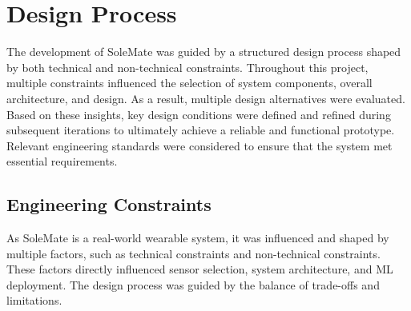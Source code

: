 
\chapter{Design Process}
\label{chapter:design_process}
The development of SoleMate was guided by a structured design process shaped by both technical and non-technical constraints. Throughout this project, multiple constraints influenced the selection of system components, overall architecture, and design. As a result, multiple design alternatives were evaluated. Based on these insights, key design conditions were defined and refined during subsequent iterations to ultimately achieve a reliable and functional prototype. Relevant engineering standards were considered to ensure that the system met essential requirements. 



\section{Engineering Constraints}
As SoleMate is a real-world wearable system, it was influenced and shaped by multiple factors, such as technical constraints and non-technical constraints. These factors directly influenced sensor selection, system architecture, and ML deployment. The design process was guided by the balance of trade-offs and limitations.\\

